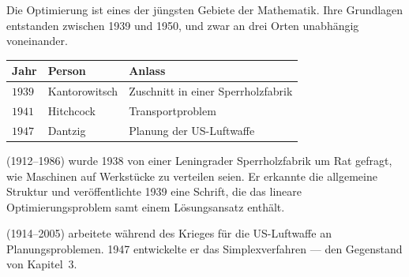 \begin{geschichte}
Die Optimierung ist eines der jüngsten Gebiete der Mathematik. Ihre Grundlagen entstanden zwischen 1939 und 1950, und zwar an drei Orten unabhängig voneinander.

\begin{center}
{\small
\renewcommand{\arraystretch}{1.45}
\begin{tabular}{@{}P{1.6cm}P{2.6cm}P{3.8cm}@{}}
\toprule
\textbf{Jahr} & \textbf{Person} & \textbf{Anlass}\\
\midrule
$1939$ & Kantorowitsch & Zuschnitt in einer Sperrholzfabrik\\
$1941$ & Hitchcock & Transportproblem\\
$1947$ & Dantzig & Planung der US-Luftwaffe\\
\bottomrule
\end{tabular}}
\end{center}

 (1912--1986) wurde 1938 von einer Leningrader Sperrholzfabrik um Rat gefragt, wie Maschinen auf Werkstücke zu verteilen seien. Er erkannte die allgemeine Struktur und veröffentlichte 1939 eine Schrift, die das lineare Optimierungsproblem samt einem Lösungsansatz enthält.

\begin{center}
\begin{minipage}{0.9\textwidth}
\end{minipage}
\end{center}

 (1914--2005) arbeitete während des Krieges für die US-Luftwaffe an Planungsproblemen. 1947 entwickelte er das Simplexverfahren --- den Gegenstand von Kapitel~3.

\begin{center}
\begin{minipage}{0.9\textwidth}
\end{minipage}
\end{center}


\end{geschichte}
